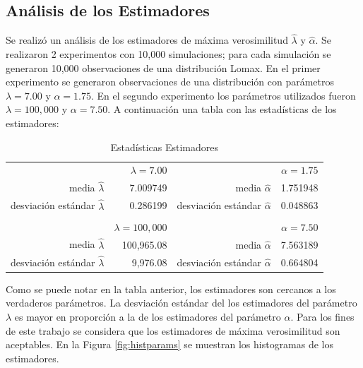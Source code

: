 \documentclass[11pt]{article}
\numberwithin{equation}{section} %
\begin{document}
\clearpage

\subsection{Análisis de los Estimadores}
\label{sec:estim}

Se realizó un análisis de los estimadores de máxima verosimilitud $\hat{\lambda}$ y $\hat{\alpha}$. Se realizaron 2 experimentos con 10,000 simulaciones; para cada simulación se generaron 10,000 observaciones de una distribución Lomax. En el primer experimento se generaron observaciones de una distribución con parámetros $\lambda=7.00$ y $\alpha=1.75$. En el segundo experimento los parámetros utilizados fueron $\lambda=100,000$ y $\alpha=7.50$. A continuación una tabla con las estadísticas de los estimadores:

\begin{table}[htbp]
\centering
\caption{Estadísticas Estimadores}
\begin{tabular}{r r r r}
& $\lambda=7.00$ & & $\alpha=1.75$ \\
media $\hat{\lambda}$ & 7.009749 & media $\hat{\alpha}$ & 1.751948\\
desviación estándar $\hat{\lambda}$ & 0.286199 & desviación estándar $\hat{\alpha}$ & 0.048863\\
\\
& $\lambda=100,000$ & & $\alpha=7.50$ \\
media $\hat{\lambda}$ & 100,965.08 & media $\hat{\alpha}$ & 7.563189\\
desviación estándar $\hat{\lambda}$ & 9,976.08 & desviación estándar $\hat{\alpha}$ & 0.664804\\
\end{tabular}%
\label{tab:estim}%
\end{table}%

Como se puede notar en la tabla anterior, los estimadores son cercanos a los verdaderos parámetros. La desviación estándar del los estimadores del parámetro $\lambda$ es mayor en proporción a la de los estimadores del parámetro $\alpha$. Para los fines de este trabajo se considera que los estimadores de máxima verosimilitud son aceptables. En la Figura \ref{fig:histparams} se muestran los histogramas de los estimadores.
\end{document}
